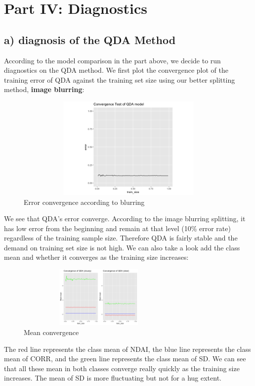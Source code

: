 \documentclass[jou]{apa}%
\begin{document}
\section{\textbf{Part IV: Diagnostics}}
\subsection{a) diagnosis of the QDA Method}
According to the model comparison in the part above, we decide to run diagnostics on the QDA method. We first plot the convergence plot of the training error of QDA against the training set size using our better splitting method, \textbf{image blurring}:
\begin{figure}[H]\hspace*{-2cm} \centering\includegraphics[width=12cm, height = 5cm]{convergeBlur}\caption{Error convergence according to blurring}\end{figure}
We see that QDA's error converge. According to the image blurring splitting, it has low error from the beginning and remain at that level (10\% error rate) regardless of the training sample size. Therefore QDA is fairly stable and the demand on training set size is not high.
\indent We can also take a look add the class mean and whether it converges as the training size increases: 
\hspace*{-1cm}\begin{figure}[H]\centering\includegraphics[width=8cm, height = 3cm]{convergeMean}\caption{Mean convergence}\end{figure}
The red line represents the class mean of NDAI, the blue line represents the class mean of CORR, and the green line represents the class mean of SD. We can see that all these mean in both classes converge really quickly as the training size increases. The mean of SD is more fluctuating but not for a hug extent.
\end{document}
